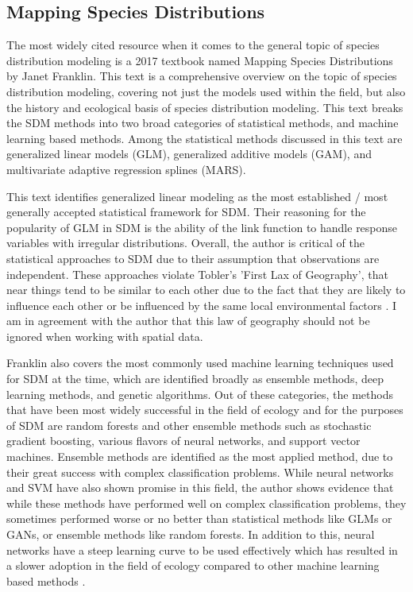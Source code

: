 \documentclass[12pt, oneside]{article}
\begin{document}
\begin{normalsize}

\subsection{Mapping Species Distributions}

The most widely cited resource when it comes to the general topic of species distribution modeling is a 2017 textbook named Mapping Species Distributions by Janet Franklin. This text is a comprehensive overview on the topic of species distribution modeling, covering not just the models used within the field, but also the history and ecological basis of species distribution modeling. This text breaks the SDM methods into two broad categories of statistical methods, and machine learning based methods. Among the statistical methods discussed in this text are generalized linear models (GLM), generalized additive models (GAM), and multivariate adaptive regression splines (MARS). 

This text identifies generalized linear modeling as the most established / most generally accepted statistical framework for SDM.  Their reasoning for the popularity of GLM in SDM is the ability of the link function to handle response variables with irregular distributions. Overall, the author is critical of the statistical approaches to SDM due to their assumption that observations are independent. These approaches violate Tobler's 'First Lax of Geography', that near things tend to be similar to each other due to the fact that they are likely to influence each other or be influenced by the same local environmental factors \cite{franklin2010mapping}. I am in agreement with the author that this law of geography should not be ignored when working with spatial data.

Franklin also covers the most commonly used machine learning techniques used for SDM at the time, which are identified broadly as  ensemble methods, deep learning methods, and genetic algorithms. Out of these categories, the methods that have been most widely successful in the field of ecology and for the purposes of SDM are random forests and other ensemble methods such as stochastic gradient boosting, various flavors of neural networks, and support vector machines. Ensemble methods are identified as the most applied method, due to their great success with complex classification problems. While neural networks and SVM have also shown promise in this field, the author shows evidence that while these methods have performed well on complex classification problems, they sometimes performed worse or no better than statistical methods like GLMs or GANs, or ensemble methods like random forests. In addition to this, neural networks have a steep learning curve to be used effectively which has resulted in a slower adoption in the field of ecology compared to other machine learning based methods \cite{franklin2010mapping}.


\end{normalsize}
\end{document}
